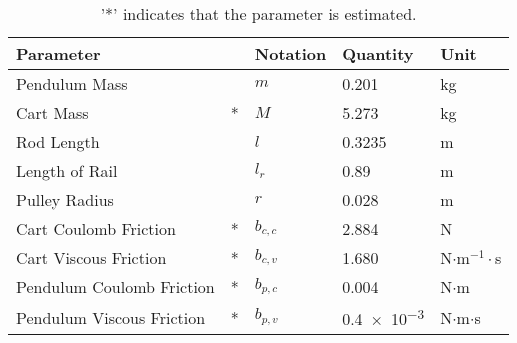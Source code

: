 \begin{table}[H]
  \begin{tabular}{|lp{.4cm}|l|l|l|}
    \hline %
    \textbf{Parameter}        &   & \textbf{Notation} & \textbf{Quantity} & \textbf{Unit} \\
    \hline %
    Pendulum Mass             &   &   $m$             & \num{0.201}       &  kg           \\
    \hline %
    Cart Mass                 & * &   $M$             & \num{5.273}       &  kg           \\
    \hline %
    Rod Length                &   &   $l$             & \num{0.3235}      &  m            \\
    \hline %
    Length of Rail            &   &   $l_r$           & \num{0.89}        &  m            \\
    \hline %
    Pulley Radius             &   &   $r$             & \num{0.028}       &  m            \\
    \hline %
    Cart Coulomb Friction     & * &   $b_{c,c}$       & \num{2.884}       &  N            \\
    \hline %
    Cart Viscous Friction     & * &   $b_{c,v}$       & \num{1.680}       &  N$\cdot$m$^{-1}\cdot$s \\
    \hline %
    Pendulum Coulomb Friction & * &   $b_{p,c}$       & \num{0.004}       &  N$\cdot$m              \\
    \hline %
    Pendulum Viscous Friction & * &   $b_{p,v}$       & \num{0.4e-3}      &  N$\cdot$m$\cdot$s      \\
    \hline %
  \end{tabular}
  \caption{'*' indicates that the parameter is estimated\cite{JHHorgensen}.\label{table:systemParameters}}
\end{table}
